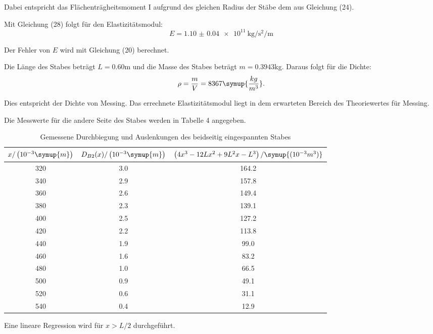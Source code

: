 Dabei entspricht das Flächenträgheitsmoment I aufgrund des gleichen Radius der Stäbe
dem aus Gleichung (24).

Mit Gleichung (28) folgt für den Elastizitätsmodul:
\begin{equation}
  E = \SI{1.10(4)e11}{\kilo\gram\per\second\squared\per\meter}
\end{equation}

Der Fehler von $E$ wird mit Gleichung (20) berechnet.

Die Länge des Stabes beträgt $L = 0.60$m und die Masse des Stabes beträgt $m = 0.3943$kg.
Daraus folgt für die Dichte:
\begin{equation}
  \rho = \frac{m}{V} = 8367 \symup{\frac{kg}{m^3}} .
\end{equation}

Dies entspricht der Dichte von Messing. Das errechnete Elastizitätsmodul liegt in dem
erwarteten Bereich des Theoriewertes für Messing.

Die Messwerte für die andere Seite des Stabes werden in Tabelle 4 angegeben.

\begin{table}[H]
  \centering
  \caption{Gemessene Durchbiegung und Auslenkungen des beidseitig eingespannten Stabes}
  \label{tab:beidseitig}
  \begin{tabular}{c c c}
    \toprule
    $x/\left(10^{-3}\symup{m}\right)$ & $D_{B2}(x)/\left(10^{-3}\symup{m}\right)$ & $\left(4x^3-12Lx^2 + 9L^2x-L^3\right)/\symup{(10^{-3}m^3)}$ \\
    \midrule
    320 & 3.0 & 164.2 \\
    340 & 2.9 & 157.8 \\
    360 & 2.6 & 149.4 \\
    380 & 2.3 & 139.1 \\
    400 & 2.5 & 127.2 \\
    420 & 2.2 & 113.8 \\
    440 & 1.9 & 99.0 \\
    460 & 1.6 & 83.2 \\
    480 & 1.0 & 66.5 \\
    500 & 0.9 & 49.1 \\
    520 & 0.6 & 31.1 \\
    540 & 0.4 & 12.9 \\
    \bottomrule
  \end{tabular}
\end{table}

Eine lineare Regression wird für $x>L/2$ durchgeführt.

